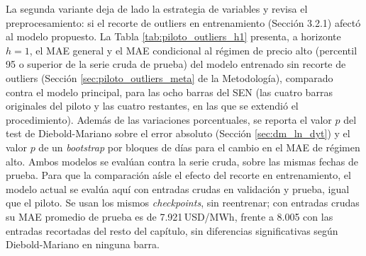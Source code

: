 La segunda variante deja de lado la estrategia de variables y revisa el preprocesamiento: si el recorte de outliers en entrenamiento (Sección 3.2.1) afectó al modelo propuesto. La Tabla \ref{tab:piloto_outliers_h1} presenta, a horizonte $h=1$, el MAE general y el MAE condicional al régimen de precio alto (percentil 95 o superior de la serie cruda de prueba) del modelo entrenado sin recorte de outliers (Sección \ref{sec:piloto_outliers_meta} de la Metodología), comparado contra el modelo principal, para las ocho barras del SEN (las cuatro barras originales del piloto y las cuatro restantes, en las que se extendió el procedimiento). Además de las variaciones porcentuales, se reporta el valor $p$ del test de Diebold-Mariano sobre el error absoluto (Sección \ref{sec:dm_ln_dyt}) y el valor $p$ de un \textit{bootstrap} por bloques de días para el cambio en el MAE de régimen alto. Ambos modelos se evalúan contra la serie cruda, sobre las mismas fechas de prueba. Para que la comparación aísle el efecto del recorte en entrenamiento, el modelo actual se evalúa aquí con entradas crudas en validación y prueba, igual que el piloto. Se usan los mismos \textit{checkpoints}, sin reentrenar; con entradas crudas su MAE promedio de prueba es de 7.921\,USD/MWh, frente a 8.005 con las entradas recortadas del resto del capítulo, sin diferencias significativas según Diebold-Mariano en ninguna barra.

